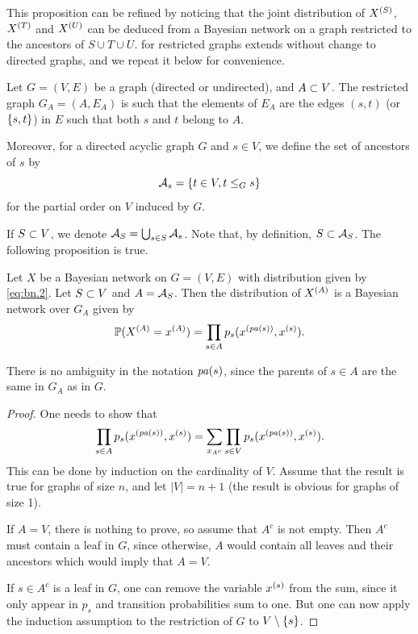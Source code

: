 This proposition can be refined by noticing that the joint
distribution of $X^{(S)}$, $X^{(T)}$ and $X^{(U)}$ can be deduced from a Bayesian
network on a graph restricted to the ancestors of $S\cup T\cup
U$.  for restricted graphs extends without change to directed graphs, and we repeat it below for convenience.
\begin{definition}
\label{def:rest.grph}
Let $G=(V,E)$ be a graph (directed or undirected), and $A\subset V$. The
restricted graph $G_A = (A, E_A)$ is such that the elements of $E_A$
are the edges $(s,t)$ (or $\left\{ s,t \right\}$) in $E$ such that both $s$
and $t$ belong to $A$.
\end{definition}
Moreover, for a directed acyclic graph $G$ and $s\in V$, we define
the set of ancestors of $s$ by
\begin{equation}
\label{eq:anc}
{\mathcal A}_s = \left\{ t\in V, t\leq_G s \right\}
\end{equation}
for the partial order on $V$ induced by $G$. 

If $S\subset V$, we denote ${\mathcal A}_S = \bigcup_{s\in S} {\mathcal A}_s$. Note that,
by definition, $S\subset {\mathcal A}_S$. The following proposition is true.
\begin{proposition}
\label{prop:rest}
Let $X$ be a Bayesian network on $G=(V,E)$ with distribution given by
\cref{eq:bn.2}. Let $S\subset V$ and $A = {\mathcal A}_S$. Then the distribution
of $X^{(A)}$ is a Bayesian network over $G_A$ given by
\begin{equation}
\label{eq:bn.rest}
\bm{\mathbb P}(X^{(A)} = x^{(A)}) = \prod_{s\in A} p_s(x^{({\mathit{pa}(s)})}, x^{(s)}).
\end{equation}
\end{proposition}
There is no ambiguity in the notation ${\mathit{pa}(s)}$, since the
parents of $s\in A$ are the same in $G_A$ as in $G$. 
\begin{proof}
One needs to show that
\[
\prod_{s\in A} p_s(x^{({\mathit{pa}(s)})}, x^{(s)}) = \sum_{x_{A^c}} \prod_{s\in V} p_s(x^{({\mathit{pa}(s)})}, x^{(s)}).
\]
This can be done by induction on the cardinality of $V$. Assume that
the result is true for graphs of size $n$, and let $|V| = n+1$ (the
result is obvious for graphs of size 1).

If $A=V$, there is nothing to prove, so assume that $A^c$ is not
empty. Then $A^c$ must contain a leaf in $G$, since otherwise, $A$
would contain all leaves and their ancestors which would imply that
$A=V$. 

If $s\in A^c$ is a leaf in $G$, one can remove the variable $x^{(s)}$ from
the sum, since it only appear in $p_s$ and transition probabilities
sum to one. But one can now apply the induction assumption to the
restriction of $G$ to $V\setminus \{s\}$. 
\end{proof}

